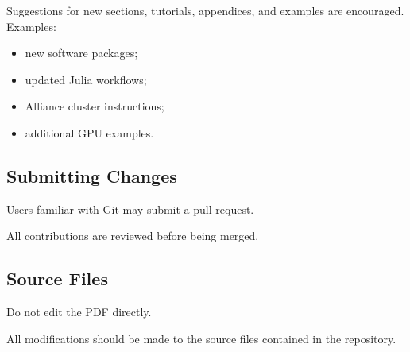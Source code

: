 Suggestions for new sections, tutorials, appendices, and examples are encouraged. Examples: 

\begin{itemize} 
    \item new software packages; 
    \item updated Julia workflows; 
    \item Alliance cluster instructions; 
    \item additional GPU examples. 
\end{itemize} 

\subsection{Submitting Changes} 

Users familiar with Git may submit a pull request. 

All contributions are reviewed before being merged. 

\subsection{Source Files} 

Do not edit the PDF directly. 

All modifications should be made to the source files contained in the repository.
